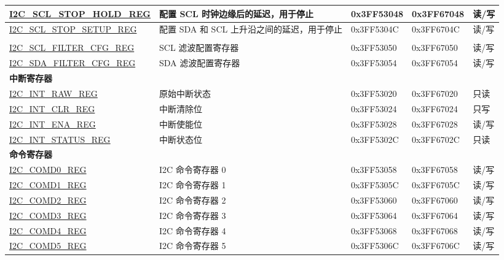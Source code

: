 \documentclass[main.tex]{subfiles}
\begin{document}
\begin{longtable}{ | p{5cm} | p{5.3cm} | p{2cm} | p{2cm} | p{1.2cm} | }
\multirow{2}{*}{\hyperref[regdesc:I2CSCLSTOPHOLDREG]{I2C\_SCL\_STOP\_HOLD\_REG}} & 配置 SCL 时钟边缘后的延迟，用于停止 & \multirow{2}{*}{0x3FF53048} & \multirow{2}{*}{0x3FF67048} & \multirow{2}{*}{读/写}\\ \hline
\multirow{2}{*}{\hyperref[regdesc:I2CSCLSTOPSETUPREG]{I2C\_SCL\_STOP\_SETUP\_REG}} & 配置 SDA 和 SCL 上升沿之间的延迟，用于停止 & \multirow{2}{*}{0x3FF5304C} & \multirow{2}{*}{0x3FF6704C} & \multirow{2}{*}{读/写}\\ \hline
\multicolumn{5}{|l|}{\textbf{滤波寄存器}} \\ \hline
\hyperref[regdesc:I2CSCLFILTERCFGREG]{I2C\_SCL\_FILTER\_CFG\_REG}& SCL 滤波配置寄存器& 0x3FF53050 & 0x3FF67050 & 读/写\\ \hline
\hyperref[regdesc:I2CSDAFILTERCFGREG]{I2C\_SDA\_FILTER\_CFG\_REG} & SDA 滤波配置寄存器 & 0x3FF53054 & 0x3FF67054 & 读/写\\ \hline
\multicolumn{5}{|l|}{\textbf{中断寄存器}} \\ \hline
\hyperref[regdesc:I2CINTRAWREG]{I2C\_INT\_RAW\_REG} & 原始中断状态 & 0x3FF53020 & 0x3FF67020 & 只读 \\ \hline
\hyperref[regdesc:I2CINTCLRREG]{I2C\_INT\_CLR\_REG} & 中断清除位 & 0x3FF53024 & 0x3FF67024 & 只写 \\ \hline
\hyperref[regdesc:I2CINTENAREG]{I2C\_INT\_ENA\_REG} & 中断使能位 & 0x3FF53028 & 0x3FF67028 & 读/写\\ \hline
\hyperref[regdesc:I2CINTSTATUSREG]{I2C\_INT\_STATUS\_REG} & 中断状态位 & 0x3FF5302C & 0x3FF6702C & 只读\\ \hline
\multicolumn{5}{|l|}{\textbf{命令寄存器}} \\ \hline
\hyperref[regdesc:I2CCOMDnREG]{I2C\_COMD0\_REG} & I2C 命令寄存器 0 & 0x3FF53058 & 0x3FF67058 & 读/写\\ \hline
\hyperref[regdesc:I2CCOMDnREG]{I2C\_COMD1\_REG} & I2C 命令寄存器 1 & 0x3FF5305C & 0x3FF6705C & 读/写\\ \hline
\hyperref[regdesc:I2CCOMDnREG]{I2C\_COMD2\_REG} & I2C 命令寄存器 2 & 0x3FF53060 & 0x3FF67060 & 读/写\\ \hline
\hyperref[regdesc:I2CCOMDnREG]{I2C\_COMD3\_REG} & I2C 命令寄存器 3 & 0x3FF53064 & 0x3FF67064 & 读/写\\ \hline
\hyperref[regdesc:I2CCOMDnREG]{I2C\_COMD4\_REG} & I2C 命令寄存器 4 & 0x3FF53068 & 0x3FF67068 & 读/写\\ \hline
\hyperref[regdesc:I2CCOMDnREG]{I2C\_COMD5\_REG} & I2C 命令寄存器 5 & 0x3FF5306C & 0x3FF6706C & 读/写\\ \hline

\end{longtable}
\end{document}
